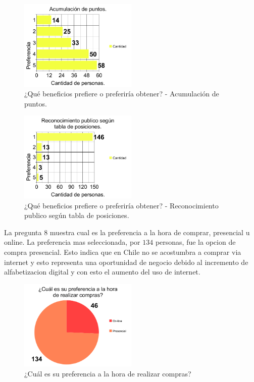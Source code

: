 \begin{figure}[!htb]
  \centering
  \includegraphics[width=0.5\textwidth]{images/chartPreg7_3.png}
  \caption[chart7-3]{¿Qué beneficios prefiere o preferiría obtener? - Acumulación de puntos.}
  \label{fig:chart2}
\end{figure}

\begin{figure}[!htb]
  \centering
  \includegraphics[width=0.5\textwidth]{images/chartPreg7_4.png}
  \caption[chart7-4]{¿Qué beneficios prefiere o preferiría obtener? - Reconocimiento publico según tabla de posiciones.}
  \label{fig:chart2}
\end{figure}

La pregunta $8$ muestra cual es la preferencia a la hora de comprar, presencial u online. La preferencia
mas seleccionada, por $134$ personas, fue la opcion de compra presencial. Esto indica que en Chile
no se acostumbra a comprar via internet y esto representa una oportunidad de negocio debido al
incremento de alfabetizacion digital y con esto el aumento del uso de internet.

\begin{figure}[!htb]
  \centering
  \includegraphics[width=0.5\textwidth]{images/chartPreg8.png}
  \caption[chart8]{¿Cuál es su preferencia a la hora de realizar compras?}
  \label{fig:chart2}
\end{figure}


